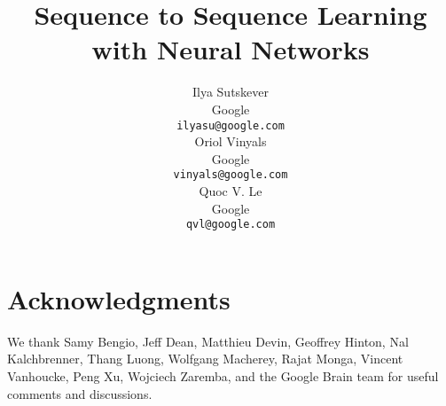 \documentclass{article} %
\title{Sequence to Sequence Learning\\with Neural Networks}
\author{
Ilya Sutskever \\
Google\\
\texttt{ilyasu@google.com} \\
\And
Oriol Vinyals \\
Google\\
\texttt{vinyals@google.com} \\
\And
Quoc V. Le \\
Google\\
\texttt{qvl@google.com} \\
}
\begin{document}
\maketitle















\small
\section{Acknowledgments}

We thank Samy Bengio, Jeff Dean, Matthieu Devin, Geoffrey Hinton, Nal Kalchbrenner, Thang Luong, Wolfgang
Macherey, Rajat Monga, Vincent Vanhoucke, Peng Xu, Wojciech Zaremba,
and the Google Brain team for useful comments and discussions.


 

\end{document}
